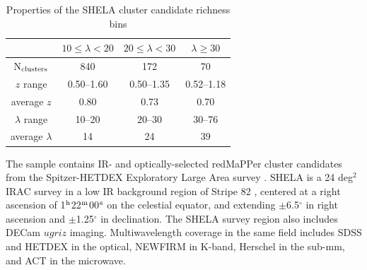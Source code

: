 \documentclass[a4paper,fleqn,usenatbib]{mnras}
\begin{document}
\begin{table}
  \centering
  \caption{Properties of the SHELA cluster candidate richness bins}
  \begin{tabular}{|*{4}{c|}}
    \hline
    & $10 \leq \lambda < 20$ & $20 \leq \lambda < 30$ & $\lambda \geq 30$ \\ \hline
    
    N$_{\rm clusters}$ & 840 & 172 & 70 \\ \hline
     
    $z$ range & 0.50--1.60 & 0.50--1.35 & 0.52--1.18  \\ \hline
    
    average $z$ & 0.80 & 0.73 & 0.70 \\ \hline
    
    $\lambda$ range & 10--20 & 20--30 & 30--76 \\ \hline %
    
    average $\lambda$ & 14 & 24 & 39 \\ \hline
    
    \end{tabular}
\label{table:sampleinfo}
\end{table}


The sample contains IR- and optically-selected redMaPPer cluster candidates from the Spitzer-HETDEX Exploratory Large Area survey  \citep{2016ApJS..224...28P}. 
SHELA is a 24 deg$^2$ IRAC survey in a low IR background region of Stripe 82 \citep{2000AJ....120.1579Y}, centered at a right ascension of 1$^{\rm h}$22$^{\rm m}$00$^{\rm s}$ on the celestial equator, and extending $\pm$6.5$^{\circ}$ in right ascension and $\pm$1.25$^{\circ}$ in declination. 
The SHELA survey region also includes DECam $ugriz$ imaging. Multiwavelength coverage in the same field includes SDSS and HETDEX in the optical, NEWFIRM in K-band, Herschel in the sub-mm, and ACT in the microwave. 
\end{document}
